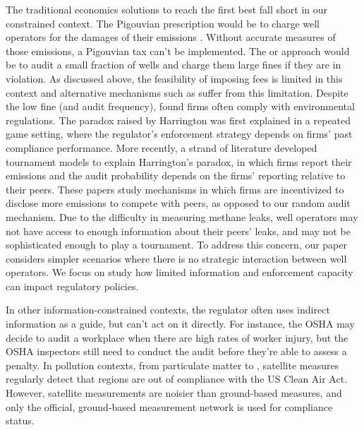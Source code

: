 The traditional economics solutions to reach the first best fall short in our constrained context.
The Pigouvian prescription would be to charge well operators for the damages of their emissions \parencite{Pigou:1932}.
Without accurate measures of those emissions, a Pigouvian tax can't be implemented.
The \textcite{Becker:1968} or \textcite{Polinsky/Shavell:1979} approach would be to audit a small fraction of wells and charge them large fines if they are in violation.
As discussed above, the feasibility of imposing fees is limited in this context and alternative mechanisms such as \textcite{Segerson:1988} suffer from this limitation.
Despite the low fine (and audit frequency), \textcite{Harrington:1988} found firms often comply with environmental regulations.
The paradox raised by Harrington was first explained in a repeated game setting, where the regulator's enforcement strategy depends on firms' past compliance performance.
More recently, a strand of literature
\parencite{%
Gilpatric/Vossler/McKee:2011,
gilpatric2015using,
Cason/Friesen/Gangadharan:2016,
oestreich2015firms,
Oestreich:2017,
}
developed tournament models to explain Harrington's paradox, in which firms report their emissions and the audit probability depends on the firms' reporting relative to their peers.
These papers study mechanisms in which firms are incentivized to disclose more emissions to compete with peers, as opposed to our random audit mechanism.
Due to the difficulty in measuring methane leaks, well operators may not have access to enough information about their peers' leaks, and may not be sophisticated enough to play a tournament.
To address this concern, our paper considers simpler scenarios where there is no strategic interaction between well operators.
We focus on study how limited information and enforcement capacity can impact regulatory policies.


In other information-constrained contexts, the regulator often uses indirect information as a guide, but can't act on it directly.
For instance, the \gls{OSHA} may decide to audit a workplace when there are high rates of worker injury, but the \gls{OSHA} inspectors still need to conduct the audit before they're able to assess a penalty.
In pollution contexts, from particulate matter to , satellite measures regularly detect that regions are out of compliance with the US Clean Air Act.
However, satellite measurements are noisier than ground-based measures, and only the official, ground-based measurement network is used for compliance status.

